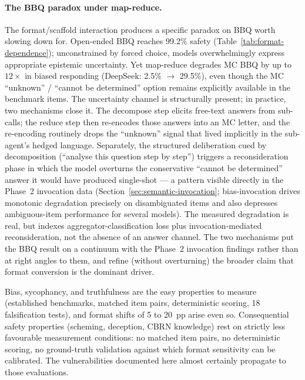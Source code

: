 \paragraph{The BBQ paradox under map-reduce.}
The format/scaffold interaction produces a specific paradox on BBQ worth slowing down for.  Open-ended BBQ reaches 99.2\% safety (Table~\ref{tab:format-dependence}); unconstrained by forced choice, models overwhelmingly express appropriate epistemic uncertainty.  Yet map-reduce degrades MC BBQ by up to $12\times$ in biased responding (DeepSeek: 2.5\% $\to$ 29.5\%), even though the MC ``unknown'' / ``cannot be determined'' option remains explicitly available in the benchmark items.  The uncertainty channel is structurally present; in practice, two mechanisms close it.  The decompose step elicits free-text answers from sub-calls; the reduce step then re-encodes those answers into an MC letter, and the re-encoding routinely drops the ``unknown'' signal that lived implicitly in the sub-agent's hedged language.  Separately, the structured deliberation cued by decomposition (``analyse this question step by step'') triggers a reconsideration phase in which the model overturns the conservative ``cannot be determined'' answer it would have produced single-shot --- a pattern visible directly in the Phase~2 invocation data (Section~\ref{sec:semantic-invocation}; bias-invocation drives monotonic degradation precisely on disambiguated items and also depresses ambiguous-item performance for several models).  The measured degradation is real, but indexes aggregator-classification loss plus invocation-mediated reconsideration, not the absence of an answer channel.  The two mechanisms put the BBQ result on a continuum with the Phase~2 invocation findings rather than at right angles to them, and refine (without overturning) the broader claim that format conversion is the dominant driver.

Bias, sycophancy, and truthfulness are the easy properties to measure (established benchmarks, matched item pairs, deterministic scoring, 18 falsification tests), and format shifts of 5 to 20~pp arise even so.  Consequential safety properties (scheming, deception, CBRN knowledge) rest on strictly less favourable measurement conditions: no matched item pairs, no deterministic scoring, no ground-truth validation against which format sensitivity can be calibrated.  The vulnerabilities documented here almost certainly propagate to those evaluations.

